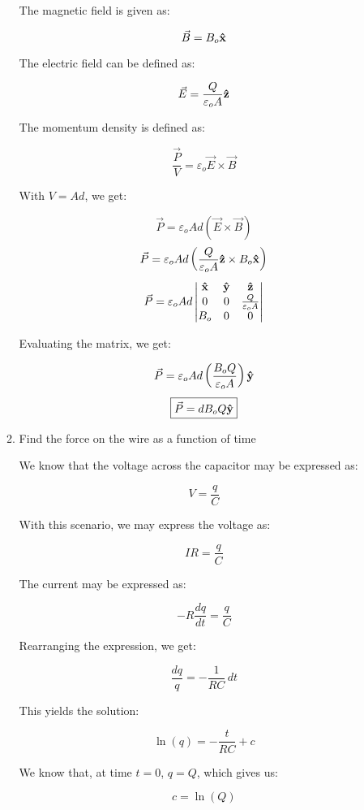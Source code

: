 \begin{enumerate}
\begin{enumerate}
        The magnetic field is given as:

        $$\vec{B}=B_o\bold{\hat{x}}$$

        The electric field can be defined as:

        $$\vec{E}=\frac{Q}{\varepsilon_o A}\bold{\hat{z}}$$

        The momentum density is defined as:

        $$\frac{\vec{P}}{V}=\varepsilon_o\vec{E}\times\vec{B}$$

        With $V=Ad$, we get:

        $$\vec{P}=\varepsilon_oAd\left(\vec{E}\times\vec{B}\right)$$
        $$\vec{P}=\varepsilon_oAd\left(\frac{Q}{\varepsilon_o A}\bold{\hat{z}}\times B_o\bold{\hat{x}}\right)$$
        $$\vec{P}=\varepsilon_oAd\left|\begin{matrix} \bold{\hat{x}} & \bold{\hat{y}} & \bold{\hat{z}}\\ 0 & 0 & \frac{Q}{\varepsilon_o A}\\ B_o & 0 & 0\\ \end{matrix}\right|$$

        Evaluating the matrix, we get:

        $$\vec{P}=\varepsilon_oAd\left( \frac{B_oQ}{\varepsilon_o A} \right)\bold{\hat{y}}$$
        $$\boxed{\vec{P}=dB_oQ\bold{\hat{y}}}$$

      \item Find the force on the wire as a function of time

        We know that the voltage across the capacitor may be expressed as:

        $$V=\frac{q}{C}$$

        With this scenario, we may express the voltage as:

        $$IR=\frac{q}{C}$$

        The current may be expressed as:

        $$-R\frac{dq}{dt}=\frac{q}{C}$$

        Rearranging the expression, we get:

        $$\frac{dq}{q}=-\frac{1}{RC}\,dt$$

        This yields the solution:

        $$\ln(q)=-\frac{t}{RC}+c$$

        We know that, at time $t=0$, $q=Q$, which gives us:

        $$c=\ln(Q)$$


\end{enumerate}
\end{enumerate}
